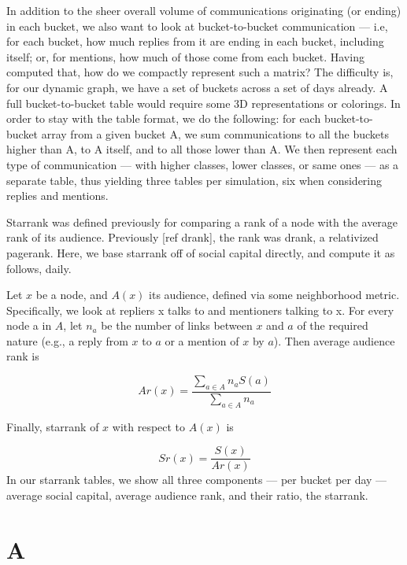 \documentclass[10pt,oneside]{memoir}
\def\mybibliostyle{plain}
\def\bibliocommand{}
\begin{document}
In addition to the sheer overall volume of communications originating (or ending) in each bucket, we also want to look at bucket-to-bucket communication --- i.e, for each bucket, how much replies from it are ending in each bucket, including itself; or, for mentions, how much of those come from each bucket.
Having computed that, how do we compactly represent such a matrix?  The difficulty is, for our dynamic graph, we have a set of buckets across a set of days already.  A full bucket-to-bucket table would require some 3D representations or colorings.  In order to stay with the table format, we do the following: for each bucket-to-bucket array from a given bucket A, we sum communications to all the buckets higher than A, to A itself, and to all those lower than A.  We then represent each type of communication --- with higher classes, lower classes, or same ones --- as a separate table, thus yielding three tables per simulation, six when considering replies and mentions.


Starrank was defined previously for comparing a rank of a node with the average rank of its audience.  Previously [ref drank], the rank was drank, a relativized pagerank.  Here, we base starrank off of social capital directly, and compute it as follows, daily.



Let $x$ be a node, and $A(x)$ its audience, defined via some neighborhood metric.  Specifically, we look at repliers x talks to and mentioners talking to x.  For every node a in $A$, let $n_a$ be the number of links between $x$ and $a$ of the required nature (e.g., a reply from $x$ to $a$ or a mention of $x$ by $a$).  Then average audience rank is

\[ Ar(x) = \frac{\sum_{a \in A} n_a S(a)}{\sum_{a \in A} n_a} \]

Finally, starrank of $x$ with respect to $A(x)$ is

\[ Sr(x) = \frac{S(x)}{Ar(x)} \]
In our starrank tables, we show all three components --- per bucket per day --- average social capital, average audience rank, and their ratio, the starrank.



\appendixpage
\appendix
\chapter{A}
\pagestyle{plain}


%
%

\backmatter


\bibliocommand

\printglossary


\printindex
\end{document}
